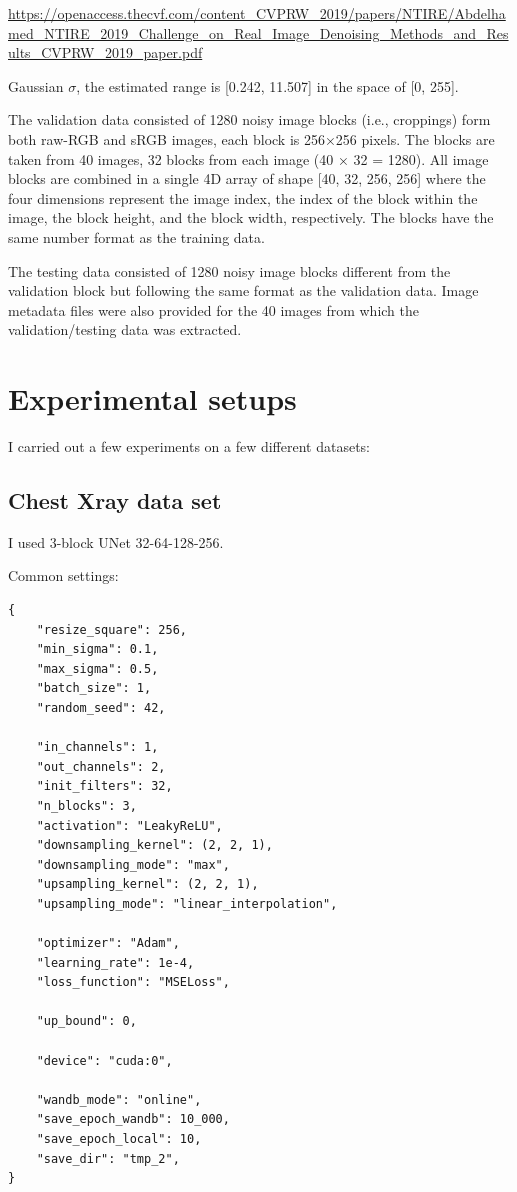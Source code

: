 \documentclass[12pt]{article}
\begin{document}
\url{https://openaccess.thecvf.com/content_CVPRW_2019/papers/NTIRE/Abdelhamed_NTIRE_2019_Challenge_on_Real_Image_Denoising_Methods_and_Results_CVPRW_2019_paper.pdf}

Gaussian $\sigma$, the estimated range is [0.242, 11.507]
in the space of [0, 255].

The validation data consisted of 1280 noisy image blocks
(i.e., croppings) form both raw-RGB and sRGB images,
each block is 256×256 pixels. The blocks are taken from 40
images, 32 blocks from each image (40 × 32 = 1280). All
image blocks are combined in a single 4D array of shape
[40, 32, 256, 256] where the four dimensions represent the
image index, the index of the block within the image, the
block height, and the block width, respectively. The blocks
have the same number format as the training data. 

The testing data consisted of 1280 noisy image blocks different from the validation block but following the same format
as the validation data. Image metadata files were also provided for the 40 images from which the validation/testing
data was extracted.




\section{Experimental setups}

I carried out a few experiments on a few different datasets:

\subsection{Chest Xray data set}

I used 3-block UNet 32-64-128-256. 

Common settings:

\begin{verbatim}
{
    "resize_square": 256,
    "min_sigma": 0.1,
    "max_sigma": 0.5,
    "batch_size": 1,
    "random_seed": 42,

    "in_channels": 1,
    "out_channels": 2,
    "init_filters": 32,
    "n_blocks": 3,
    "activation": "LeakyReLU",
    "downsampling_kernel": (2, 2, 1),
    "downsampling_mode": "max",
    "upsampling_kernel": (2, 2, 1),
    "upsampling_mode": "linear_interpolation",

    "optimizer": "Adam",
    "learning_rate": 1e-4,
    "loss_function": "MSELoss",

    "up_bound": 0,
    
    "device": "cuda:0",

    "wandb_mode": "online",
    "save_epoch_wandb": 10_000,
    "save_epoch_local": 10,
    "save_dir": "tmp_2",
}
\end{verbatim}
\end{document}
